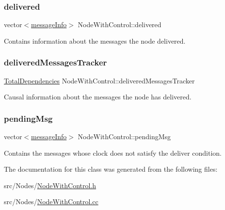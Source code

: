 \subsubsection{\texorpdfstring{delivered}{delivered}}
{\footnotesize\ttfamily vector$<$\hyperlink{structures_8h_a7e7bdc1d2fff8a9436f2f352b2711ed6}{message\+Info}$>$ Node\+With\+Control\+::delivered\hspace{0.3cm}{\ttfamily [protected]}}



Contains information about the messages the node delivered. 

\mbox{\label{class_node_with_control_a6c868fa52cca68f650dca96a788475df}} 
\subsubsection{\texorpdfstring{delivered\+Messages\+Tracker}{deliveredMessagesTracker}}
{\footnotesize\ttfamily \hyperlink{class_total_dependencies}{Total\+Dependencies} Node\+With\+Control\+::delivered\+Messages\+Tracker\hspace{0.3cm}{\ttfamily [protected]}}



Causal information about the messages the node has delivered. 

\mbox{\label{class_node_with_control_af38ffbedc82038536c77314f22ea6b57}} 
\subsubsection{\texorpdfstring{pending\+Msg}{pendingMsg}}
{\footnotesize\ttfamily vector$<$\hyperlink{structures_8h_a7e7bdc1d2fff8a9436f2f352b2711ed6}{message\+Info}$>$ Node\+With\+Control\+::pending\+Msg\hspace{0.3cm}{\ttfamily [protected]}}



Contains the messages whose clock does not satisfy the deliver condition. 



The documentation for this class was generated from the following files\+:\begin{DoxyCompactItemize}
\item 
src/\+Nodes/\hyperlink{_node_with_control_8h}{Node\+With\+Control.\+h}\item 
src/\+Nodes/\hyperlink{_node_with_control_8cc}{Node\+With\+Control.\+cc}\end{DoxyCompactItemize}
